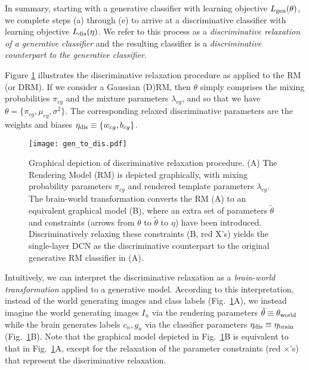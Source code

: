 \documentclass[12pt]{article}
\begin{document}
In summary, starting with a generative classifier with learning objective $L_{\rm gen}(\theta)$, we complete steps (a) through (e) to arrive at a discriminative classifier with learning objective $L_{\rm dis}(\eta)$. We refer to this process as a \emph{discriminative relaxation of a generative classifier} and the resulting classifier is a \emph{discriminative counterpart to the generative classifier}. 

Figure \ref{fig:discr-relax-RM} illustrates the discriminative relaxation procedure as applied to the RM (or DRM). If we consider a Gaussian (D)RM, then $\theta$ simply comprises the mixing probabilities $\pi_{cg}$ and the mixture parameters $\lambda_{cg}$, and so that we have $\theta = \{ \pi_{cg}, \mu_{cg}, \sigma^2 \}$. The corresponding relaxed discriminative parameters are the weights and biases $\eta_{\rm dis} \equiv \{ w_{cg}, b_{cg}\}$.

\begin{figure}
   \centering
   \texttt{[image: gen\_to\_dis.pdf]} 
   \caption{Graphical depiction of discriminative relaxation procedure. (A) The Rendering Model (RM) is depicted graphically, with mixing probability parameters $\pi_{cg}$ and rendered template parameters $\lambda_{cg}$. The brain-world transformation converts the RM (A) to an equivalent graphical model (B), where an extra set of parameters $\tilde{\theta}$ and constraints (arrows from $\theta$ to $\tilde{\theta}$ to $\eta$) have been introduced. Discriminatively relaxing these constraints (B, red X's) yields the single-layer DCN as the discriminative counterpart to the original generative RM classifier in (A).}
   \label{fig:discr-relax-RM}
\end{figure}

Intuitively, we can interpret the discriminative relaxation as a {\em brain-world transformation} applied to a generative model. According to this interpretation, instead of the world generating images and class labels (Fig.~\ref{fig:discr-relax-RM}A), we instead imagine the world generating images $I_{n}$ via the rendering parameters $\tilde{\theta} \equiv \theta_{\rm world}$ while the brain generates labels $c_{n},g_{n}$ via the classifier parameters $\eta_{\rm dis} \equiv \eta_{\rm brain}$ (Fig.~\ref{fig:discr-relax-RM}B). Note that the graphical model depicted in Fig.~\ref{fig:discr-relax-RM}B is equivalent to that in Fig.~\ref{fig:discr-relax-RM}A, except for the relaxation of the parameter constraints (red $\times$'s) that represent the discriminative relaxation.
\end{document}
